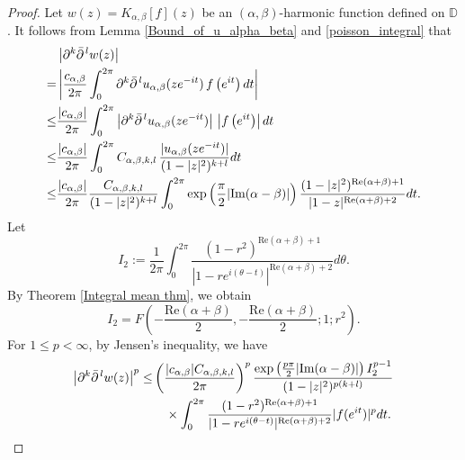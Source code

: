 \documentclass[11pt, reqno]{amsart}
\theoremstyle{definition}
\numberwithin{equation}{section}
\newcommand{\abs}[1]{\left\vert#1\right\vert}
\theoremstyle{remark}
\numberwithin{equation}{section}
\begin{document}
	\begin{proof}
		Let  $w(z)=K_{\alpha,\beta}[f](z)$ be an $(\alpha,\beta)$-harmonic function defined on  $\mathbb{D}$. %
		It follows from Lemma \ref{Bound_of_u_alpha_beta} and \eqref{poisson_integral} that
		\begin{align*}
        \begin{split}
			&\left| \partial^{k} \bar{\partial}^{\,l} w(z) \right|
			\\=&
			\left|
			\frac{c_{\alpha,\beta}}{2\pi}
			\int_{0}^{2\pi}
			\partial^{k} \bar{\partial}^{\,l} u_{\alpha,\beta}(ze^{-it})\,
			f\left(e^{it}\right)dt
			\right|\\\leq&\frac{|c_{\alpha,\beta}|}{2\pi}
			\int_{0}^{2\pi}
			\abs{\partial^{k} \bar{\partial}^{\,l} u_{\alpha,\beta}(ze^{-it})}\,
			\abs{f\left(e^{it}\right)}dt\\\leq&\frac{|c_{\alpha,\beta}|}{2\pi}
			\int_{0}^{2\pi}C_{\alpha,\beta,k,l}\,
			\frac{|u_{\alpha,\beta}(ze^{-it})|}{(1-|z|^2)^{k+l}}dt\\\leq & \frac{|c_{\alpha,\beta}|}{2\pi}
			\frac{C_{\alpha,\beta,k,l}}{(1-|z|^2)^{k+l}}\int_{0}^{2\pi}\exp\left(\frac{\pi}{2}|\text{\rm Im}(\alpha-\beta)|\right)\frac{(1-|z|^2)^{\text{Re}(\alpha+\beta)+1}}{|1-z|^{\text{Re}(\alpha+\beta)+2}}dt.
            \end{split}
		\end{align*}
		Let $$I_2:=\frac{1}{2\pi}\int_0^{2\pi}\frac{(1-r^2)^{\text{Re}(\alpha+\beta)+1}}{|1-re^{i(\theta-t)}|^{\text{Re}(\alpha+\beta)+2}} d\theta.$$
		By Theorem \ref{Integral mean thm}, we obtain
		$$I_2=F\left(-\frac{\mbox{Re}(\alpha+\beta)}{2},-\frac{\mbox{Re}(\alpha+\beta)}{2};1;r^2\right).$$
		For $1\leq p<\infty$, by Jensen's inequality, we have
		\begin{align*}
        \begin{split}
			\left| \partial^{k} \bar{\partial}^{\,l} w(z) \right|^p \leq &
			 \left(\frac{|c_{\alpha,\beta}|C_{\alpha,\beta,k,l}}{2\pi}\right)^p \frac{\exp\left(\frac{p\pi}{2}| \text{\rm Im}(\alpha-\beta)|\right)I_2^{p-1}}{(1-|z|^2)^{p(k+l)}}\\&\quad\times\int_{0}^{2\pi}\frac{(1-r^2)^{\text{Re}(\alpha+\beta)+1}}{|1-re^{i(\theta-t)}|^{\text{Re}(\alpha+\beta)+2}}|f(e^{it})|^p dt.
            \end{split}

\end{align*}
\end{proof}
\end{document}

